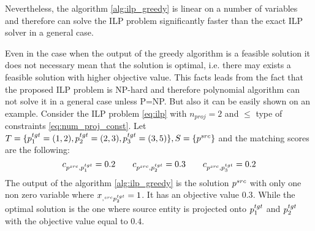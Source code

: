 Nevertheless, the algorithm \ref{alg:ilp_greedy} is linear on a number of variables and therefore can
solve the ILP problem significantly faster than the exact ILP solver in a general case.

Even in the case when the output of the greedy algorithm is a feasible solution it does not
necessary mean that the solution is optimal, i.e. there may exists a feasible solution with higher objective
value. This facts leads from the fact that the proposed ILP problem is NP-hard and therefore polynomial
algorithm can not solve it in a general case unless P=NP. But also it can be easily shown on an example.
Consider the ILP problem \eqref{eq:ilp} with \( n_{proj} = 2 \) and \( \leq \) type of constraints \eqref{eq:num_proj_const}.
Let \( T = \{ p_1^{tgt} = (1, 2), p_2^{tgt} = (2, 3), p_3^{tgt} = (3, 5) \}, S = \{ p^{src} \} \) and
the matching scores are the following:
\[
  c_{p^{src}, p_1^{tgt}} = 0.2 \qquad
  c_{p^{src}, p_2^{tgt}} = 0.3 \qquad
  c_{p^{src}, p_3^{tgt}} = 0.2
\]
The output of the algorithm \ref{alg:ilp_greedy} is the solution \( p^{src} \) with only one
non zero variable where \( x_{,^{src} p_2^{tgt}} = 1 \). It has an objective value \( 0.3 \).
While the optimal solution is the one where source entity is projected onto \( p_1^{tgt} \) and
\( p_2^{tgt} \) with the objective value equal to \( 0.4 \).
